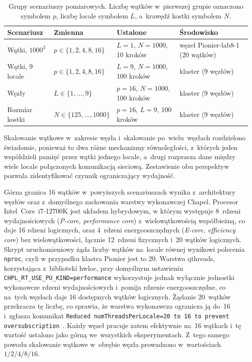 \begin{table}[htbp]
\centering
\caption{Grupy scenariuszy pomiarowych. Liczbę wątków w~pierwszej grupie oznaczono
symbolem $p$, liczbę locale symbolem $L$, a~krawędź kostki symbolem $N$.}
\label{tab:scenariusze}
\small
\begin{tabular}{@{}>{\raggedright\arraybackslash}p{2.8cm}>{\raggedright\arraybackslash}p{3.4cm}>{\raggedright\arraybackslash}p{4.0cm}>{\raggedright\arraybackslash}p{2.8cm}@{}}
\toprule
Scenariusz & Zmienna & Ustalone & Środowisko \\
\midrule
Wątki, $1000^3$       & $p\in\{1{,}2{,}4{,}8{,}16\}$ & $L{=}1$, $N{=}1000$, 10 kroków & węzeł Pionier-lab8-1 (20 wątków) \\
Wątki, 9 locale      & $p\in\{1{,}2{,}4{,}8{,}16\}$ & $L{=}9$, $N{=}1000$, 100 kroków   & klaster (9 węzłów) \\
Węzły                 & $L\in\{1{,}\ldots{,}9\}$ & $p{=}16$, $N{=}1000$, 100 kroków & klaster (9 węzłów) \\
Rozmiar kostki        & $N\in\{125{,}\ldots{,}1000\}$ & $p{=}16$, $L{=}9$, 100 kroków & klaster (9 węzłów) \\
\bottomrule
\end{tabular}
\end{table}

Skalowanie wątkowe w~zakresie węzła i~skalowanie po~wielu~węzłach rozdzielono świadomie, ponieważ
to dwa różne mechanizmy równoległości, z~których jeden współdzieli pamięć przez
wątki jednego locale, a~drugi rozprasza dane między wiele locale połączonych komunikacją sieciową.
Zestawienie obu perspektyw pozwala zidentyfikować czynnik ograniczający wydajność.

Górna granica \num{16} wątków w~powyższych scenariuszach wynika z~architektury węzłów oraz
z~domyślnego zachowania warstwy wykonawczej Chapel. Procesor Intel~Core~i7-12700K jest
układem hybrydowym, w którym występuje 8~rdzeni wydajnościowych (\emph{P-core, performance core}) z~wielowątkowością współbieżną, co daje
\num{16} rdzeni logicznych, oraz \num{4}~rdzeni energooszczędnych (\emph{E-core, efficiency core}) bez wielowątkowości, łącznie
12~rdzeni fizycznych i~20 wątków logicznych. Skrypt uruchomieniowy żąda liczby wątków na~locale
równej wynikowi polecenia \texttt{nproc}, czyli w przypadku klastra Pionier jest to 20. Warstwa qthreads, korzystająca z~biblioteki
hwloc, przy domyślnym ustawieniu \texttt{CHPL\_RT\_USE\_PU\_KIND=performance} wykorzystuje jednak
wyłącznie jednostki wykonawcze rdzeni wydajnościowych i~pomija rdzenie energooszczędne, co na~tych
węzłach daje \num{16} dostępnych wątków logicznych. Żądanie 20~wątków przekracza tę liczbę, co sprawia, że
warstwa wykonawcza ogranicza ją do~\num{16} i~zgłasza komunikat \texttt{Reduced
numThreadsPerLocale=20 to 16 to prevent oversubscription}~\cite{chapel-docs}. Każdy węzeł pracuje
zatem efektywnie na~\num{16} wątkach i~tę wartość ustalono jako górną we~wszystkich eksperymentach.
Z~tego samego powodu skalowanie wątkowe w~obrębie węzła prowadzono w~wartościach
$1/2/4/8/16$.

